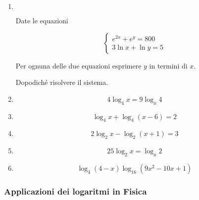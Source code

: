 \begin{enumerate}
\item $ $

Date le equazioni

\[
\left\{
\begin{array}{ll}
e^{2x}+e^y=800\\
3\ln x+\ln y = 5
\end{array}
\right.
\]

Per ognuna delle due equazioni esprimere $y$ in termini di $x$.

Dopodiché risolvere il sistema.

\item 
\[
4\log_4 x=9\log_x 4
\]

\item \[
\log_4x+\log_4(x-6)=2
\]

\item \[
2\log_2 x-\log_2(x+1)=3
\]

\item \[
25\log_2x=\log_x2
\]

\item \[
\log_4(4-x)\log_{16}(9x^2-10x+1)
\]

\end{enumerate}

\subsubsection{Applicazioni dei logaritmi in Fisica}\label{subsec:val_num}

